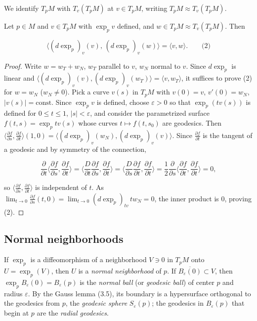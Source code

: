 \begin{lemma}[Gauss]
  \label{lem:dc-ch3-3-5}
  \notready
  We identify $T_pM$ with $T_v(T_pM)$ at $v\in T_pM$, writing $T_pM\approx T_v(T_pM)$.
  
  Let $p\in M$ and $v\in T_pM$ with $\exp_p v$ defined, and $w\in T_pM\approx T_v(T_pM)$.
  Then
  
  $$
  \langle(d\exp_p)_v(v),\,(d\exp_p)_v(w)\rangle=\langle v,w\rangle.\qquad\text{(2)}
  $$
\end{lemma}
\begin{proof}
  \sketch
  Write $w=w_T+w_N$, $w_T$ parallel to $v$, $w_N$ normal to $v$. Since
  $d\exp_p$ is linear and
  $\langle(d\exp_p)_v(v),(d\exp_p)_v(w_T)\rangle=\langle v,w_T\rangle$, it suffices
  to prove (2) for $w=w_N$ ($w_N\ne 0$). Pick a curve $v(s)$ in $T_pM$ with
  $v(0)=v$, $v'(0)=w_N$, $|v(s)|=\text{const}$. Since $\exp_p v$ is defined,
  choose $\varepsilon>0$ so that $\exp_p(tv(s))$ is defined for $0\le t\le 1$,
  $|s|<\varepsilon$, and consider the parametrized surface
  $f(t,s)=\exp_p tv(s)$ whose curves $t\mapsto f(t,s_0)$ are geodesics.
  Then $\langle\frac{\partial f}{\partial s},\frac{\partial f}{\partial t}\rangle(1,0)=\langle(d\exp_p)_v(w_N),(d\exp_p)_v(v)\rangle$.
  Since $\frac{\partial f}{\partial t}$ is the tangent of a geodesic and by symmetry
  of the connection,
  
  $$
  \frac{\partial}{\partial t}\Big\langle\frac{\partial f}{\partial s},\frac{\partial f}{\partial t}\Big\rangle=\Big\langle\frac{D}{\partial t}\frac{\partial f}{\partial s},\frac{\partial f}{\partial t}\Big\rangle=\Big\langle\frac{D}{\partial s}\frac{\partial f}{\partial t},\frac{\partial f}{\partial t}\Big\rangle=\frac12\frac{\partial}{\partial s}\Big\langle\frac{\partial f}{\partial t},\frac{\partial f}{\partial t}\Big\rangle=0,
  $$
  
  so $\langle\frac{\partial f}{\partial s},\frac{\partial f}{\partial t}\rangle$ is
  independent of $t$. As $\lim_{t\to0}\frac{\partial f}{\partial s}(t,0)=\lim_{t\to0}(d\exp_p)_{tv}\,t w_N=0$,
  the inner product is $0$, proving (2).
\end{proof}

\subsection{Normal neighborhoods}
If $\exp_p$ is a diffeomorphism of a neighborhood $V\ni 0$ in $T_pM$ onto
$U=\exp_p(V)$, then $U$ is a \emph{normal neighborhood} of $p$. If
$\overline{B_\varepsilon(0)}\subset V$, then $\exp_p B_\varepsilon(0)=B_\varepsilon(p)$
is the \emph{normal ball} (or \emph{geodesic ball}) of center $p$ and radius $\varepsilon$.
By the Gauss lemma (3.5), its boundary is a hypersurface orthogonal to the
geodesics from $p$, the \emph{geodesic sphere} $S_\varepsilon(p)$; the geodesics in
$B_\varepsilon(p)$ that begin at $p$ are the \emph{radial geodesics}.

